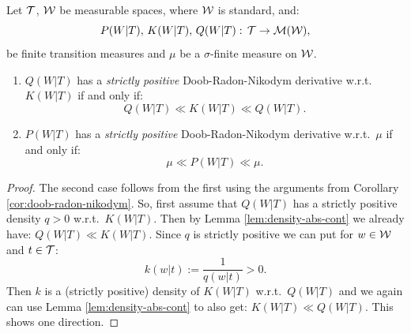 \begin{Cor}
    \label{cor:abs-cont-str-pos-den}
    Let $\mathcal{T}$, $\mathcal{W}$ be measurable spaces, where $\mathcal{W}$ is standard, and:
    \[ P(W|T),\, K(W|T), \,Q(W|T):\, \mathcal{T} \to \mathcal{M}(\mathcal{W}),  \]
    be finite transition measures and $\mu$ be a $\sigma$-finite measure on $\mathcal{W}$. 
    \begin{enumerate}
        \item $Q(W|T)$ has a \emph{strictly positive} Doob-Radon-Nikodym derivative w.r.t.\ $K(W|T)$ if and only if:
            \[ Q(W|T) \ll K(W|T) \ll Q(W|T).   \]
        \item $P(W|T)$ has a \emph{strictly positive} Doob-Radon-Nikodym derivative w.r.t.\ $\mu$ if and only if:
            \[ \mu \ll P(W|T) \ll \mu.   \]
    \end{enumerate}
\begin{proof}
    The second case follows from the first using the arguments from Corollary \ref{cor:doob-radon-nikodym}. 
    So, first assume that $Q(W|T)$ has a strictly positive density $q >0$ w.r.t.\ $K(W|T)$. Then by Lemma \ref{lem:density-abs-cont} we already have: 
    $Q(W|T) \ll K(W|T)$. Since $q$ is strictly positive we can put for $w \in \mathcal{W}$ and $t \in \mathcal{T}$:
    \[
        k(w|t) := \frac{1}{q(w|t)} >0.
    \]
    Then $k$ is a (strictly positive) density of $K(W|T)$ w.r.t.\ $Q(W|T)$ and we again can use Lemma \ref{lem:density-abs-cont} to also get: $K(W|T) \ll Q(W|T)$.
    This shows one direction.


\end{proof}
\end{Cor}
